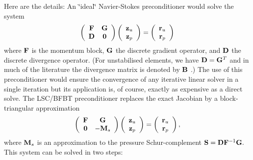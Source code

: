Here are the details\+: An \char`\"{}ideal\char`\"{} Navier-\/\+Stokes preconditioner would solve the system \[ \left( \begin{array}{cc} {\bf F} & {\bf G} \\ {\bf D} & {\bf 0} \end{array} \right) \left( \begin{array}{c} {\bf z}_u \\ {\bf z}_p \end{array} \right) = \left( \begin{array}{c} {\bf r}_u \\ {\bf r}_p \end{array} \right) \] where $ {\bf F}$ is the momentum block, $ {\bf G} $ the discrete gradient operator, and $ {\bf D}$ the discrete divergence operator. (For unstabilised elements, we have $ {\bf D} = {\bf G}^T $ and in much of the literature the divergence matrix is denoted by $ {\bf B} $ .) The use of this preconditioner would ensure the convergence of any iterative linear solver in a single iteration but its application is, of course, exactly as expensive as a direct solve. The L\+S\+C/\+B\+F\+BT preconditioner replaces the exact Jacobian by a block-\/triangular approximation \[ \left( \begin{array}{cc} {\bf F} & {\bf G} \\ {\bf 0} & -{\bf M}_s \end{array} \right) \left( \begin{array}{c} {\bf z}_u \\ {\bf z}_p \end{array} \right) = \left( \begin{array}{c} {\bf r}_u \\ {\bf r}_p \end{array} \right), \] where ${\bf M}_s$ is an approximation to the pressure Schur-\/complement $ {\bf S} = {\bf D} {\bf F}^{-1}{\bf G}. $ This system can be solved in two steps\+:
